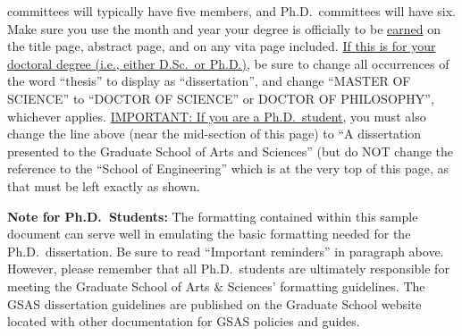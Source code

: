 \begin{thesistitlepage}
\begin{singlespace}
committees will typically have five members, and Ph.D.\ committees will have
six.  Make sure you use the month and year your degree is officially to be
\uline{earned} on the title page, abstract page, and on any vita page included.
\uline{If this is for your doctoral degree (i.e., either D.Sc.\ or Ph.D.)}, be
sure to change all occurrences of the word ``thesis'' to display as
``dissertation'', and change ``MASTER OF SCIENCE'' to ``DOCTOR OF SCIENCE'' or
DOCTOR OF PHILOSOPHY'', whichever applies.   \uline{IMPORTANT:  If you are a
Ph.D.\ student}, you must also change the line above (near the mid-section of
this page) to ``A dissertation presented to the Graduate School of Arts and
Sciences'' (but do NOT change the reference to the ``School of Engineering''
which is at the very top of this page, as that must be left exactly as shown.

{\small \textbf{Note for Ph.D.\ Students:}}
The formatting contained within this sample document can serve well in
emulating the basic formatting needed for the Ph.D.\ dissertation.  Be sure to
read ``Important reminders'' in paragraph above.\\ However, please remember
that all Ph.D.\ students are ultimately responsible for meeting the Graduate
School of Arts \& Sciences' formatting guidelines.  The GSAS dissertation
guidelines are published on the Graduate School website located with other
documentation for GSAS policies and guides.

\end{singlespace}
\fi
\end{thesistitlepage}

